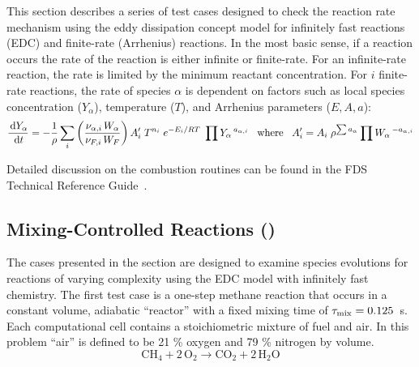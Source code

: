 \documentclass[11pt]{book}
\begin{document}
This section describes a series of test cases designed to check the reaction rate mechanism using the eddy dissipation concept model for infinitely fast reactions (EDC) and  finite-rate (Arrhenius) reactions. In the most basic sense, if a reaction occurs the rate of the reaction is either infinite or finite-rate. For an infinite-rate reaction, the rate is limited by the minimum reactant concentration. For $i$ finite-rate reactions, the rate of species $\alpha$ is dependent on factors such as local species concentration ($Y_{\alpha}$), temperature ($T$), and Arrhenius parameters ($E,A,a$):
\begin{equation}\label{eq:finite_rate1}
\frac{\,\mathrm{d} Y_{\alpha}}{\,\mathrm{d} t} = -\frac{1}{\rho}\sum_{i} \left(\frac{\nu_{\alpha,i}\,W_{\alpha}}{\nu_{F,i}\,W_{F}}\right)A_i^{\prime}\;T^{n_i}\;e^{-E_i/RT}\;\prod Y_{\alpha}\,^{a_{\alpha,i}} \;\;\; \text{where} \;\;\; A^{\prime}_{i} = A_{i}\;\rho^{\sum a_{\alpha}}\prod W_{\alpha}\,^{-a_{\alpha,i}}
\end{equation}

Detailed discussion on the combustion routines can be found in the FDS Technical Reference Guide~\cite{FDS_Tech_Guide}.

\subsection{Mixing-Controlled Reactions (\texorpdfstring{}{reactionrate\_EDC})}
\label{mixing_reactions}
\label{reactionrate_EDC_flim_1step_CH4}
\label{reactionrate_EDC_flim_1step_C3H8}
\label{reactionrate_EDC_1step_CH4_nonmix}
\label{reactionrate_EDC_O2lim_1step}
\label{reactionrate_EDC_O2lim_2fuel}
\label{reactionrate_series_reaction}
\label{reactionrate_EDC_flim_2step}
\label{reactionrate_lumped_two_air}

The cases presented in the section are designed to examine species evolutions for reactions of varying complexity using the EDC model with infinitely fast chemistry. The first test case is a one-step methane reaction that occurs in a constant volume, adiabatic ``reactor'' with a fixed mixing time of $\tau_{\rm mix}=0.125$~s. Each computational cell contains a stoichiometric mixture of fuel and air. In this problem ``air'' is defined to be 21 \% oxygen and 79 \% nitrogen by volume.
\begin{equation}\label{eq:1step_methane}
\mathrm{CH_4 + 2\, O_2 \rightarrow  CO_2 + 2\, H_2O}
\end{equation}
\end{document}
